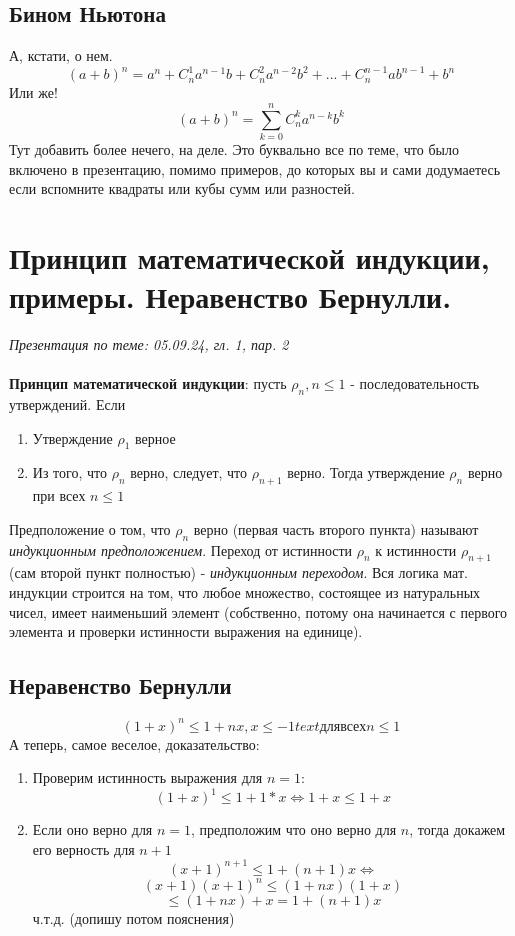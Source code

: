 \documentclass[10pt, a4paper,twocolumn]{article}
\begin{document}
\subsection{Бином Ньютона}
А, кстати, о нем.
$$(a + b)^n = a^n + C^{1}_{n} a^{n - 1} b + C^{2}_{n} a^{n - 2} b^{2} + {...} +C^{n - 1}_{n} a b^{n - 1} + b^{n}$$
Или же!
$$(a + b)^n = \displaystyle\sum_{k = 0}^{n} C^{k}_{n} a^{n - k} b^{k}$$
Тут добавить более нечего, на деле. Это буквально все по теме, что было включено в презентацию, помимо примеров, до которых вы и сами додумаетесь если вспомните квадраты или кубы сумм или разностей.

\section{Принцип математической индукции, примеры. Неравенство Бернулли.}
\textsl{Презентация по теме: 05.09.24, гл. 1, пар. 2}
\\ \\
\textbf{Принцип математической индукции}: пусть $\rho_n, n \leq 1$ - последовательность утверждений. Если 
\begin{enumerate}
\item Утверждение  $\rho_1$ верное
\item Из того, что $\rho_n$ верно, следует, что $\rho_{n + 1}$ верно. Тогда утверждение $\rho_n$ верно при всех $n \leq 1$
\end{enumerate}
Предположение о том, что $\rho_n$ верно (первая часть второго пункта) называют \textsl{индукционным предположением}. Переход от истинности $\rho_n$ к истинности $\rho_{n + 1}$ (сам второй пункт полностью) - \textsl{индукционным переходом}. Вся логика мат. индукции строится на том, что любое множество, состоящее из натуральных чисел, имеет наименьший элемент (собственно, потому она начинается с первого элемента и проверки истинности выражения на единице).
\subsection{Неравенство Бернулли}
$$(1 + x)^{n} \leq 1 + nx, x \leq -1 text{для всех} n \leq 1$$
А теперь, самое веселое, доказательство:
\begin{enumerate}
\item Проверим истинность выражения для $n = 1$:
$$(1 + x)^{1} \leq 1 + 1 * x \Leftrightarrow 1 + x \leq 1 + x$$
\item Если оно верно для $n = 1$, предположим что оно верно для $n$, тогда докажем его верность для $n + 1$
$$(x + 1)^{n + 1} \leq 1 + (n + 1)x \Leftrightarrow$$
$$(x + 1)(x + 1)^{n}  \leq (1 + nx)(1 + x)$$
$$ \leq (1 + nx) + x = 1 + (n + 1)x $$
ч.т.д.
(допишу потом пояснения)
\end{enumerate}
\end{document}
